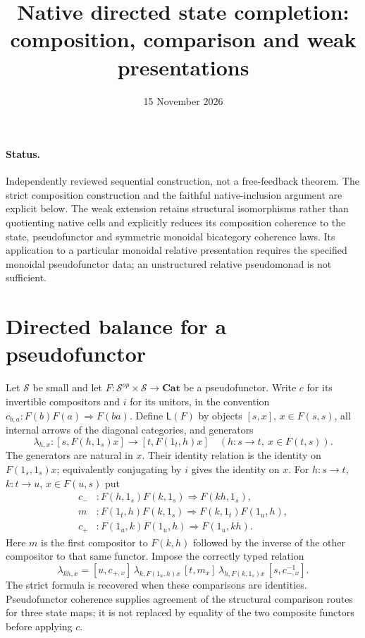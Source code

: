 \documentclass[11pt]{article}
\title{Native directed state completion: composition, comparison and weak presentations}
\date{15 November 2026}
\begin{document}
\maketitle
\paragraph{Status.} Independently reviewed sequential construction, not a free-feedback theorem. The strict composition construction and the faithful native-inclusion argument are explicit below. The weak extension retains structural isomorphisms rather than quotienting native cells and explicitly reduces its composition coherence to the state, pseudofunctor and symmetric monoidal bicategory coherence laws. Its application to a particular monoidal relative presentation requires the specified monoidal pseudofunctor data; an unstructured relative pseudomonad is not sufficient.

\section{Directed balance for a pseudofunctor}
Let $\mathcal S$ be small and let $F:\mathcal S^{op}\times\mathcal S\to\mathbf{Cat}$ be a pseudofunctor. Write $c$ for its invertible compositors and $i$ for its unitors, in the convention $c_{b,a}:F(b)F(a)\Rightarrow F(ba)$. Define $\mathsf L(F)$ by objects $[s,x]$, $x\in F(s,s)$, all internal arrows of the diagonal categories, and generators
\[
 \lambda_{h,x}:[s,F(h,1_s)x]\longrightarrow[t,F(1_t,h)x]
 \quad(h:s\to t,\ x\in F(t,s)).
\]
The generators are natural in $x$. Their identity relation is the identity on $F(1_s,1_s)x$; equivalently conjugating by $i$ gives the identity on $x$.
For $h:s\to t$, $k:t\to u$, $x\in F(u,s)$ put
\begin{align*}
 c_- &: F(h,1_s)F(k,1_s)\Rightarrow F(kh,1_s),\\
 m &: F(1_t,h)F(k,1_s)\Rightarrow F(k,1_t)F(1_u,h),\\
 c_+ &: F(1_u,k)F(1_u,h)\Rightarrow F(1_u,kh).
\end{align*}
Here $m$ is the first compositor to $F(k,h)$ followed by the inverse of the other compositor to that same functor. Impose the correctly typed relation
\[
 \lambda_{kh,x}=[u,c_{+,x}]\,
 \lambda_{k,F(1_u,h)x}\,[t,m_x]\,
 \lambda_{h,F(k,1_s)x}\,[s,c_{-,x}^{-1}].
 \tag{P}
\]
The strict formula is recovered when these comparisons are identities. Pseudofunctor coherence supplies agreement of the structural comparison routes for three state maps; it is not replaced by equality of the two composite functors before applying $c$.
\end{document}

